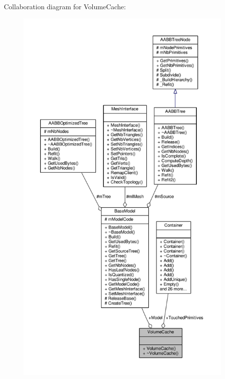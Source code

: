 Collaboration diagram for Volume\+Cache\+:
\nopagebreak
\begin{figure}[H]
\begin{center}
\leavevmode
\includegraphics[height=550pt]{db/d5b/structVolumeCache__coll__graph}
\end{center}
\end{figure}
